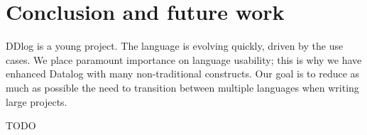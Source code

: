 \section{Conclusion and future work}\label{sec-conclusions}

DDlog is a young project.  The language is evolving quickly, driven by
the use cases.  We place paramount importance on language usability;
this is why we have enhanced Datalog with many non-traditional
constructs.  Our goal is to reduce as much as possible the need to
transition between multiple languages when writing large projects.

TODO
